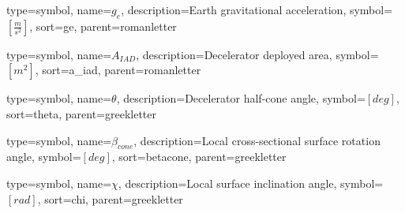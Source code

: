 {
type=symbol, %
name={\ensuremath{g_{e}}}, %
description={Earth gravitational acceleration}, %
symbol={$\left[\frac{m}{s^2} \right]$}, %
sort=ge, %
parent=romanletter %
}

{
type=symbol, %
name={\ensuremath{A_{IAD}}}, %
description={Decelerator deployed area}, %
symbol={$\left[m^2 \right]$}, %
sort=a_iad, %
parent=romanletter %
}

{
type=symbol, %
name={\ensuremath{\theta}}, %
description={Decelerator half-cone angle}, %
symbol={$\left[deg \right]$}, %
sort=theta, %
parent=greekletter %
}

{
	type=symbol, %
	name={\ensuremath{\beta_{cone}}}, %
	description={Local cross-sectional surface rotation angle}, %
	symbol={$\left[deg \right]$}, %
	sort=betacone, %
	parent=greekletter %
}

{
	type=symbol, %
	name={\ensuremath{\chi}}, %
	description={Local surface inclination angle}, %
	symbol={$\left[rad \right]$}, %
	sort=chi, %
	parent=greekletter %
}

